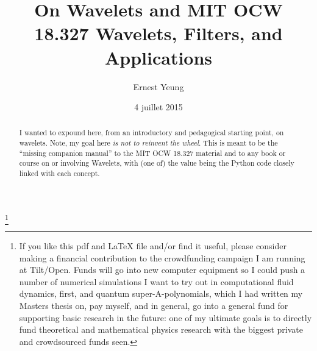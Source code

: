 \documentclass[twoside]{amsart}
\theoremstyle{plain}
\theoremstyle{definition}
\theoremstyle{remark}
\numberwithin{equation}{section}
\begin{document}
\title[Wavelets]{On Wavelets and MIT OCW 18.327 Wavelets, Filters, and Applications}
\author{Ernest Yeung}
\address{}
\thanks{If you like this pdf and LaTeX file and/or find it useful, please consider making a financial contribution to the crowdfunding campaign I am running at Tilt/Open.  Funds will go into new computer equipment so I could push a number of numerical simulations I want to try out in computational fluid dynamics, first, and quantum super-A-polynomials, which I had written my Masters thesis on, pay myself, and in general, go into a general fund for supporting basic research in the future: one of my ultimate goals is to directly fund theoretical and mathematical physics research with the biggest private and crowdsourced funds seen. }






\date{4 juillet 2015}
\begin{abstract}
I wanted to expound here, from an introductory and pedagogical starting point, on wavelets.  Note, my goal here \emph{is not to reinvent the wheel}.  This is meant to be the ``missing companion manual'' to the MIT OCW 18.327 material and to any book or course on or involving Wavelets, with (one of) the value being the Python code closely linked with each concept.  
\end{abstract}
\end{document}
